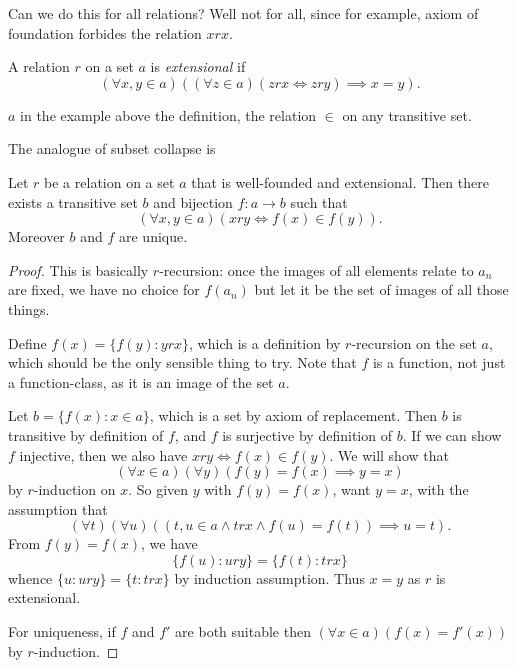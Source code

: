\documentclass[a4paper]{article}
\begin{document}
Can we do this for all relations? Well not for all, since for example, axiom of foundation forbides the relation \(x r x\).

\begin{definition}[Extensionality]
  A relation \(r\) on a set \(a\) is \emph{extensional} if
  \[
    (\forall x, y \in a) ((\forall z \in a) (z r x \iff z r y) \implies x = y).
  \]
\end{definition}

\begin{eg}
  \(a\) in the example above the definition, the relation \(\in\) on any transitive set.
\end{eg}

The analogue of subset collapse is

\begin{theorem}
  \label{thm:Mostowski}
  Let \(r\) be a relation on a set \(a\) that is well-founded and extensional. Then there exists a transitive set \(b\) and bijection \(f: a \to b\) such that
  \[
    (\forall x, y \in a) (x r y \iff f(x) \in f(y)).
  \]
  Moreover \(b\) and \(f\) are unique.
\end{theorem}

\begin{proof}
  This is basically \(r\)-recursion: once the images of all elements relate to \(a_n\) are fixed, we have no choice for \(f(a_n)\) but let it be the set of images of all those things.

  Define \(f(x) = \{f(y): y r x\}\), which is a definition by \(r\)-recursion on the set \(a\), which should be the only sensible thing to try. Note that \(f\) is a function, not just a function-class, as it is an image of the set \(a\).

  Let \(b = \{f(x): x \in a\}\), which is a set by axiom of replacement. Then \(b\) is transitive by definition of \(f\), and \(f\) is surjective by definition of \(b\). If we can show \(f\) injective, then we also have \(x r y \iff f(x) \in f(y)\). We will show that
  \[
    (\forall x \in a) (\forall y) (f(y) = f(x) \implies y = x)
  \]
  by \(r\)-induction on \(x\). So given \(y\) with \(f(y) = f(x)\), want \(y = x\), with the assumption that
  \[
    (\forall t) (\forall u) ((t, u \in a \land t r x \land f(u) = f(t)) \implies u = t).
  \]
  From \(f(y) = f(x)\), we have
  \[
    \{f(u): u r y\} = \{f(t): t r x\}
  \]
  whence \(\{u: u r y\} = \{t: t r x\}\) by induction assumption. Thus \(x = y\) as \(r\) is extensional.

  For uniqueness, if \(f\) and \(f'\) are both suitable then \((\forall x \in a) (f(x) = f'(x))\) by \(r\)-induction.
\end{proof}
\end{document}
